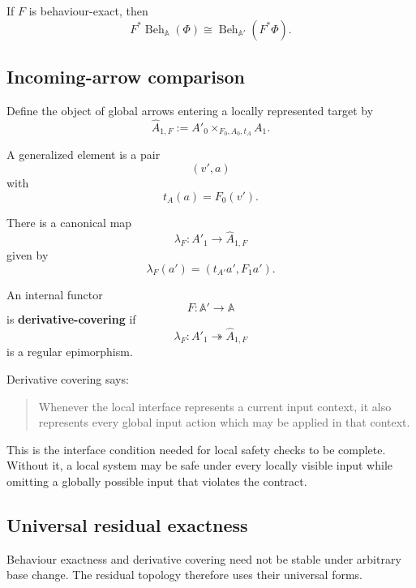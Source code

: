 \begin{corollary}
\label{cor:behavioural-abstraction-exact-restriction}
If \(F\) is behaviour-exact, then
\[
    F^\ast
    \operatorname{Beh}_{\mathbb A}(\Phi)
    \cong
    \operatorname{Beh}_{\mathbb A'}(F^\ast\Phi).
\]
\end{corollary}

\subsection{Incoming-arrow comparison}
\label{subsec:incoming-arrow-comparison}

Define the object of global arrows entering a locally represented target by
\[
    \widehat A_{1,F}
    :=
    A'_0
    \times_{F_0,A_0,t_A}
    A_1.
\]

A generalized element is a pair
\[
    (v',a)
\]
with
\[
    t_A(a)=F_0(v').
\]

There is a canonical map
\[
    \lambda_F:
    A'_1\to\widehat A_{1,F}
\]
given by
\[
    \lambda_F(a')
    =
    \left(
        t_{A'}a',
        F_1a'
    \right).
\]

\begin{definition}
\label{def:derivative-covering-input-functor}
An internal functor
\[
    F:\mathbb A'\to\mathbb A
\]
is \textbf{derivative-covering} if
\[
    \lambda_F:
    A'_1\twoheadrightarrow\widehat A_{1,F}
\]
is a regular epimorphism.
\end{definition}

Derivative covering says:

\begin{quote}
Whenever the local interface represents a current input context, it also
represents every global input action which may be applied in that context.
\end{quote}

This is the interface condition needed for local safety checks to be complete.
Without it, a local system may be safe under every locally visible input while
omitting a globally possible input that violates the contract.

\subsection{Universal residual exactness}
\label{subsec:universal-residual-exactness}

Behaviour exactness and derivative covering need not be stable under arbitrary
base change. The residual topology therefore uses their universal forms.

